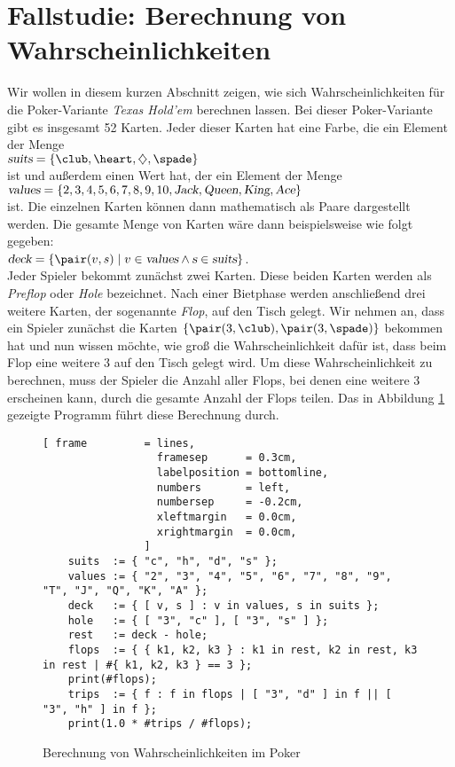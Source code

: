 \section{Fallstudie: Berechnung von Wahrscheinlichkeiten}
Wir wollen in diesem kurzen Abschnitt zeigen, wie sich Wahrscheinlichkeiten für die Poker-Variante
\textsl{Texas Hold'em} berechnen lassen.  Bei dieser Poker-Variante gibt es insgesamt 52 Karten. Jeder
dieser Karten hat eine Farbe, die ein Element der Menge
\\[0.2cm]
\hspace*{1.3cm} $\textsl{suits} = \{ \club, \heart, \diamondsuit, \spade \}$
\\[0.2cm]
ist und außerdem einen Wert hat, der ein Element der Menge
\\[0.2cm]
\hspace*{1.3cm} $\textsl{values} = \{ 2, 3, 4, 5, 6, 7, 8, 9, 10, \textsl{Jack}, \textsl{Queen},
\textsl{King}, \textsl{Ace} \}$
\\[0.2cm]
ist.  Die einzelnen Karten können dann mathematisch als Paare dargestellt werden.  Die gesamte Menge von
Karten wäre dann beispielsweise wie folgt gegeben:
\\[0.2cm]
\hspace*{1.3cm} 
$\textsl{deck} = \{ \pair(v,s) \mid v \in \textsl{values} \wedge \textsl{s} \in \textsl{suits} \}$.
\\[0.2cm]
Jeder Spieler bekommt zunächst zwei Karten.  Diese beiden Karten werden als \emph{Preflop}
oder \emph{Hole} bezeichnet.  Nach einer Bietphase werden anschließend drei weitere
Karten, der sogenannte \textsl{Flop}, auf den Tisch gelegt.  Wir nehmen an, dass ein Spieler zunächst die
Karten $\{ \pair(3, \club), \pair(3, \spade) \}$ bekommen hat und nun wissen möchte, wie groß die
Wahrscheinlichkeit dafür ist, dass beim Flop eine weitere 3 auf den Tisch gelegt wird.
Um diese Wahrscheinlichkeit zu berechnen, muss der Spieler die Anzahl aller Flops, bei denen eine weitere
3 erscheinen kann, durch die gesamte Anzahl der Flops teilen.  Das in Abbildung \ref{fig:poker-triple.stlx}
gezeigte Programm führt diese Berechnung durch.

\begin{figure}[!ht]
\centering
\begin{Verbatim}[ frame         = lines, 
                  framesep      = 0.3cm, 
                  labelposition = bottomline,
                  numbers       = left,
                  numbersep     = -0.2cm,
                  xleftmargin   = 0.0cm,
                  xrightmargin  = 0.0cm,
                ]
    suits  := { "c", "h", "d", "s" };
    values := { "2", "3", "4", "5", "6", "7", "8", "9", "T", "J", "Q", "K", "A" }; 
    deck   := { [ v, s ] : v in values, s in suits };
    hole   := { [ "3", "c" ], [ "3", "s" ] };
    rest   := deck - hole;
    flops  := { { k1, k2, k3 } : k1 in rest, k2 in rest, k3 in rest | #{ k1, k2, k3 } == 3 };
    print(#flops);
    trips  := { f : f in flops | [ "3", "d" ] in f || [ "3", "h" ] in f };
    print(1.0 * #trips / #flops);
\end{Verbatim}
\vspace*{-0.3cm}
\caption{Berechnung von Wahrscheinlichkeiten im Poker}
\label{fig:poker-triple.stlx}
\end{figure}

